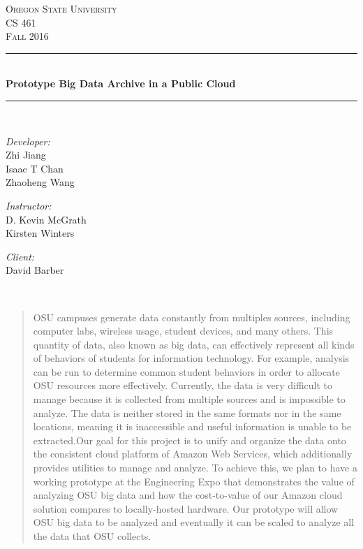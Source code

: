 \documentclass[letterpaper,10pt]{article}
\begin{document}
    \begin{titlepage}
    \newcommand{\HRule}{\rule{\linewidth}{0.5mm}}
    \center 
    \textsc{\Large Oregon State University}\\[1.5cm] 
    \textsc{\Large CS 461}\\[0.5cm] 
    \textsc{\Large Fall 2016}\\[0.5cm] 
    \HRule \\[0.4cm]
    { \huge \bfseries Prototype Big Data Archive in a Public Cloud}\\[0.4cm] %
    \HRule \\[1.5cm]
    \begin{minipage}{0.4\textwidth}
        \begin{flushleft} \large
        \emph{Developer:}\\
        Zhi Jiang\\
        Isaac T Chan\\
        Zhaoheng Wang
        \end{flushleft}
    \end{minipage}
    \begin{minipage}{0.4\textwidth}
        \begin{flushright} \large
        \emph{Instructor:} \\
        D. Kevin McGrath\\
		Kirsten Winters
        \end{flushright}
        \begin{flushright} \large
        \emph{Client:} \\
        David Barber
        \end{flushright}
    \end{minipage}\\[2cm]
    \begin{abstract}
    OSU campuses generate data constantly from multiples sources, including computer labs, wireless usage, student devices, and many others. This quantity of data, also known as big data, can effectively represent all kinds of behaviors of students for information technology. For example, analysis can be run to determine common student behaviors in order to allocate OSU resources more effectively. Currently, the data is very difficult to manage because it is collected from multiple sources and is impossible to analyze. The data is neither stored in the same formats nor in the same locations, meaning it is inaccessible and useful information is unable to be extracted.Our goal for this project is to unify and organize the data onto the consistent cloud platform of Amazon Web Services, which additionally provides utilities to manage and analyze. To achieve this, we plan to have a working prototype at the Engineering Expo that demonstrates the value of analyzing OSU big data and how the cost-to-value of our Amazon cloud solution compares to locally-hosted hardware. Our prototype will allow OSU big data to be analyzed and eventually it can be scaled to analyze all the data that OSU collects.
    \end{abstract}
    \vfill %
    \end{titlepage}
	
\end{document}
